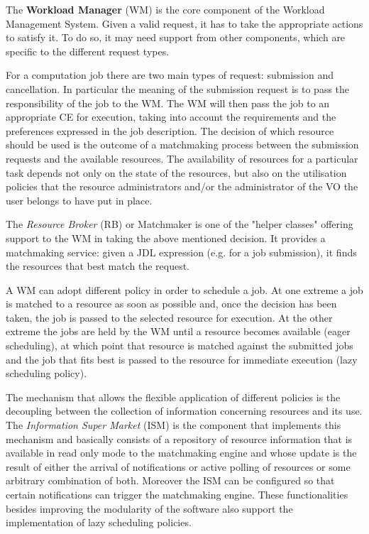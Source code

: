 The {\bf Workload Manager} (WM) is the core component of the Workload Management System. Given a valid request, it 
has to take the appropriate actions to satisfy it. To do so, it may need support from other components, which are 
specific to the different request types.

For a computation job there are two main types of request: submission and cancellation. In particular the meaning 
of the submission request is to pass the responsibility of the job to the WM. The WM will then pass the job to an 
appropriate CE for execution, taking into account the requirements and the preferences expressed in the job 
description. The decision of which resource should be used is the outcome of a matchmaking process between the 
submission requests and the available resources. The availability of resources for a particular task depends not 
only on the state of the resources, but also on the utilisation policies that the resource administrators and/or 
the administrator of the VO the user belongs to have put in place.

The {\it Resource Broker} (RB) or Matchmaker is one of the "helper classes" offering support to the WM in 
taking the above mentioned decision. It provides a matchmaking service: given a JDL expression (e.g. for a 
job submission), it finds the resources that best match the request. 

A WM can adopt different policy in order to schedule a job. At one extreme a job is matched to a resource as 
soon as possible and, once the decision has been taken, the job is passed to the selected resource for execution. 
At the other extreme the jobs are held by the WM until a resource becomes available (eager scheduling), at which 
point that resource is matched against the submitted jobs and the job that fits best is passed to the resource 
for immediate execution (lazy scheduling policy). 

The mechanism that allows the flexible application of different policies is the decoupling between the collection 
of information concerning resources and its use.  
The {\it Information Super Market} (ISM) is the component that implements this mechanism and basically consists 
of a repository of resource information that is available in read only mode to the matchmaking engine and whose 
update is the result of either the arrival of notifications or active polling of resources or some arbitrary 
combination of both. Moreover the ISM can be configured so that certain notifications can trigger the matchmaking 
engine. These functionalities besides improving the modularity of the software also support the implementation of 
lazy scheduling policies.

